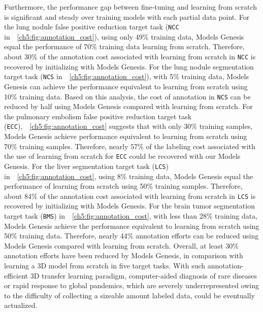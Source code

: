 Furthermore, the performance gap between fine-tuning and learning from scratch is significant and steady over training models with each partial data point. For the lung nodule false positive reduction target task (\texttt{NCC} in~\figurename~\ref{ch5:fig:annotation_cost}), using only 49\% training data, Models Genesis equal the performance of 70\% training data learning from scratch. Therefore, about 30\% of the annotation cost associated with learning from scratch in \texttt{NCC} is recovered by initializing with Models Genesis. For the lung nodule segmentation target task (\texttt{NCS} in~\figurename~\ref{ch5:fig:annotation_cost}), with 5\% training data, Models Genesis can achieve the performance equivalent to learning from scratch using 10\% training data. Based on this analysis, the cost of annotation in \texttt{NCS} can be reduced by half using Models Genesis compared with learning from scratch. For the pulmonary embolism false positive reduction target task (\texttt{ECC}),~\figurename~\ref{ch5:fig:annotation_cost} suggests that with only 30\% training samples, Models Genesis achieve performance equivalent to learning from scratch using 70\% training samples. Therefore, nearly 57\% of the labeling cost associated with the use of learning from scratch for \texttt{ECC} could be recovered with our Models Genesis. For the liver segmentation target task (\texttt{LCS}) in~\figurename~\ref{ch5:fig:annotation_cost}, using 8\% training data, Models Genesis equal the performance of learning from scratch using 50\% training samples. Therefore, about 84\% of the annotation cost associated with learning from scratch in \texttt{LCS} is recovered by initializing with Models Genesis. For the brain tumor segmentation target task (\texttt{BMS}) in~\figurename~\ref{ch5:fig:annotation_cost}, with less than 28\% training data, Models Genesis achieve the performance equivalent to learning from scratch using 50\% training data. Therefore, nearly 44\% annotation efforts can be reduced using Models Genesis compared with learning from scratch. Overall, at least 30\% annotation efforts have been reduced by Models Genesis, in comparison with learning a 3D model from scratch in five target tasks. With such annotation-efficient 3D transfer learning paradigm, computer-aided diagnosis of rare diseases or rapid response to global pandemics, which are severely underrepresented owing to the difficulty of collecting a sizeable amount labeled data, could be eventually actualized.


